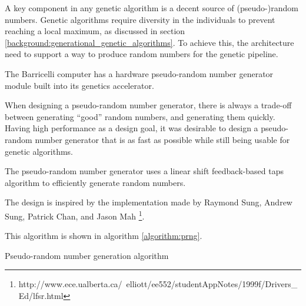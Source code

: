 A key component in any genetic algorithm is a decent source of (pseudo-)random numbers.
Genetic algorithms require diversity in the individuals to prevent reaching a local maximum, as discussed in section \ref{background:generational_genetic_algorithms}. 
To achieve this, the architecture need to support a way to produce random numbers for the genetic pipeline.   

The Barricelli computer has a hardware pseudo-random number generator module built into its genetics accelerator.

When designing a pseudo-random number generator, there is always a trade-off between generating ``good'' random numbers, and generating them quickly.
Having high performance as a design goal\cn, it was desirable to design a pseudo-random number generator that is as fast as possible while still being usable for genetic algorithms.

The pseudo-random number generator uses a linear shift feedback-based taps algorithm to efficiently generate random numbers.

The design is inspired by the implementation made by Raymond Sung, Andrew Sung, Patrick Chan, and Jason Mah \footnote{http://www.ece.ualberta.ca/~elliott/ee552/studentAppNotes/1999f/Drivers\_Ed/lfsr.html}. 

This algorithm is shown in algorithm \vref{algorithm:prng}.

\begin{algorithm}[H]
\SetAlgoLined
\DontPrintSemicolon
{}
\caption{Pseudo-random number generation algorithm}
\label{algorithm:prng}
\end{algorithm}

